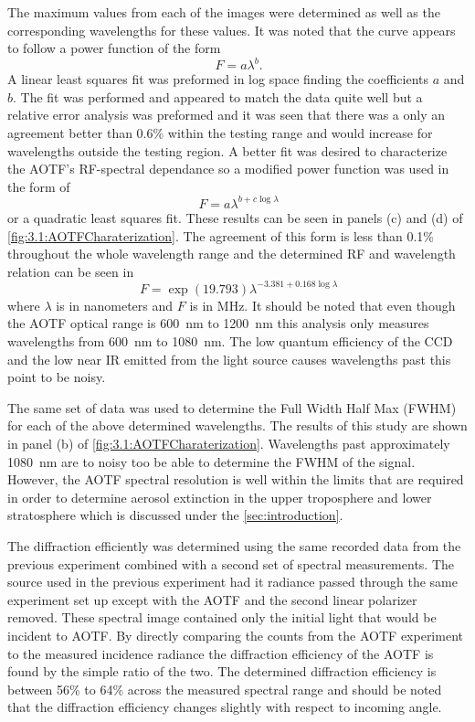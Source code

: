 \documentclass[12pt]{article}
\begin{document}
The maximum values from each of the images were determined as well as the corresponding wavelengths for these values. It was noted that the curve appears to follow a power function of the form
\begin{equation}
    \ F = a\lambda^{b}.
    \label{eqn:3.1:powerFunction}
\end{equation}
A linear least squares fit was preformed in log space finding the coefficients $a$ and $b$. The fit was performed and appeared to match the data quite well but a relative error analysis was preformed and it was seen that there was a only an agreement better than 0.6\% within the testing range and would increase for wavelengths outside the testing region. A better fit was desired to characterize the AOTF's RF-spectral dependance so a modified power function was used in the form of
 \begin{equation}
    \ F = a\lambda^{b+c\log\lambda}
    \label{eqn:3.1:modifiedPowerFunction}
\end{equation}
or a quadratic least squares fit. These results can be seen in panels (c) and (d) of \autoref{fig:3.1:AOTFCharaterization}. The agreement of this form is less than 0.1\% throughout the whole wavelength range and the determined RF and wavelength relation can be seen in
\begin{equation}
    \ F = \exp{(19.793)}\lambda^{-3.381+0.168\log\lambda}
    \label{eqn:3.1:modifiedPowerFunctionCoeffiecicents}
\end{equation}
where $\lambda$ is in nanometers and $F$ is in MHz. It should be noted that even though the AOTF optical range is 600~nm to 1200~nm this analysis only measures wavelengths from 600~nm to 1080~nm. The low quantum efficiency of the CCD and the low near IR emitted from the light source causes wavelengths past this point to be noisy.

The same set of data was used to determine the Full Width Half Max (FWHM) for each of the above determined wavelengths. The results of this study are shown in panel (b) of \autoref{fig:3.1:AOTFCharaterization}. Wavelengths past approximately 1080~nm are to noisy too be able to determine the FWHM of the signal. However, the AOTF spectral resolution is well within the limits that are required in order to determine aerosol extinction in the upper troposphere and lower stratosphere which is discussed under the \autoref{sec:introduction}.

The diffraction efficiently was determined using the same recorded data from the previous experiment combined with a second set of spectral measurements. The source used in the previous experiment had it radiance passed through the same experiment set up except with the AOTF and the second linear polarizer removed. These spectral image contained only the initial light that would be incident to AOTF. By directly comparing the counts from the AOTF experiment to the measured incidence radiance the diffraction efficiency of the AOTF is found by the simple ratio of the two. The determined diffraction efficiency is between 56\% to 64\% across the measured spectral range and should be noted that the diffraction efficiency changes slightly with respect to incoming angle.
\end{document}
